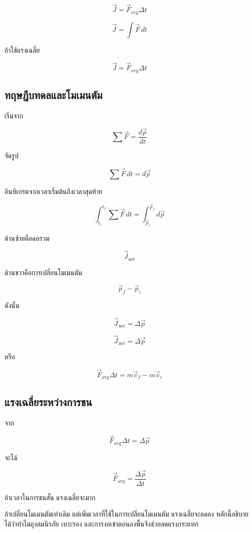 \[
\vec{J}=\vec{F}_{\text{avg}}\Delta t
\]

\begin{tcolorbox}[title=ดล]
\[
\vec{J}=\int \vec{F}\,dt
\]

ถ้าใช้แรงเฉลี่ย

\[
\vec{J}=\vec{F}_{\text{avg}}\Delta t
\]
\end{tcolorbox}

\subsection{ทฤษฎีบทดลและโมเมนตัม}

เริ่มจาก

\[
\sum \vec{F}=\frac{d\vec{p}}{dt}
\]

จัดรูป

\[
\sum \vec{F}\,dt=d\vec{p}
\]

อินทิเกรตจากเวลาเริ่มต้นถึงเวลาสุดท้าย

\[
\int_{t_i}^{t_f}\sum \vec{F}\,dt
=
\int_{\vec{p}_i}^{\vec{p}_f}d\vec{p}
\]

ด้านซ้ายคือดลรวม

\[
\vec{J}_{\text{net}}
\]

ด้านขวาคือการเปลี่ยนโมเมนตัม

\[
\vec{p}_f-\vec{p}_i
\]

ดังนั้น

\[
\vec{J}_{\text{net}}=\Delta \vec{p}
\]

\begin{tcolorbox}[title=ทฤษฎีบทดลและโมเมนตัม]
\[
\vec{J}_{\text{net}}=\Delta \vec{p}
\]

หรือ

\[
\vec{F}_{\text{avg}}\Delta t=m\vec{v}_f-m\vec{v}_i
\]
\end{tcolorbox}

\subsection{แรงเฉลี่ยระหว่างการชน}

จาก

\[
\vec{F}_{\text{avg}}\Delta t=\Delta \vec{p}
\]

จะได้

\[
\vec{F}_{\text{avg}}=\frac{\Delta \vec{p}}{\Delta t}
\]

ถ้าเวลาในการชนสั้น แรงเฉลี่ยจะมาก

\begin{tcolorbox}[title=ข้อควรจำ]
ถ้าเปลี่ยนโมเมนตัมเท่าเดิม แต่เพิ่มเวลาที่ใช้ในการเปลี่ยนโมเมนตัม แรงเฉลี่ยจะลดลง หลักนี้อธิบายได้ว่าทำไมถุงลมนิรภัย เบาะรอง และการงอเข่าตอนลงพื้นจึงช่วยลดแรงกระแทก
\end{tcolorbox}

